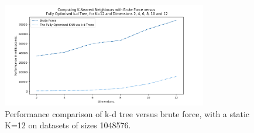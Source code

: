 \begin{figure}[H]
\centering
\includegraphics[width=0.8\textwidth]{pics/plot-figs/new-brute-k12-lines.png}
\caption{Performance comparison of k-d tree versus brute force, with a static K=12 on datasets of sizes 1048576.}
\label{fig:b4}
\end{figure}

